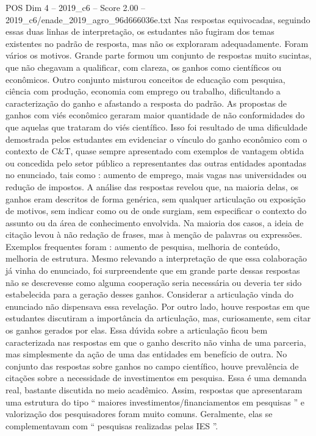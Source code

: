 \begin{textsample}{POS Dim 4 – 2019\_c6 – Score 2.00 – 2019\_c6/enade\_2019\_agro\_96d666036e.txt}
Nas respostas equivocadas, seguindo essas duas linhas de interpretação, os estudantes não fugiram dos temas existentes no padrão de resposta, mas não os exploraram adequadamente.
Foram vários os motivos.
Grande parte formou um conjunto de respostas muito sucintas, que não chegavam a qualificar, com clareza, os ganhos como científicos ou econômicos.
Outro conjunto misturou conceitos de educação com pesquisa, ciência com produção, economia com emprego ou trabalho, dificultando a caracterização do ganho e afastando a resposta do padrão.
As propostas de ganhos com viés econômico geraram maior quantidade de não conformidades do que aquelas que trataram do viés científico.
Isso foi resultado de uma dificuldade demostrada pelos estudantes em evidenciar o vínculo do ganho econômico com o contexto de C\&T, quase sempre apresentado com exemplos de vantagem obtida ou concedida pelo setor público a representantes das outras entidades apontadas no enunciado, tais como : aumento de emprego, mais vagas nas universidades ou redução de impostos.
A análise das respostas revelou que, na maioria delas, os ganhos eram descritos de forma genérica, sem qualquer articulação ou exposição de motivos, sem indicar como ou de onde surgiam, sem especificar o contexto do assunto ou da área de conhecimento envolvida.
Na maioria dos casos, a ideia de citação levou à não redação de frases, mas à menção de palavras ou expressões.
Exemplos frequentes foram : aumento de pesquisa, melhoria de conteúdo, melhoria de estrutura.
Mesmo relevando a interpretação de que essa colaboração já vinha do enunciado, foi surpreendente que em grande parte dessas respostas não se descrevesse como alguma cooperação seria necessária ou deveria ter sido estabelecida para a geração desses ganhos.
Considerar a articulação vinda do enunciado não dispensava essa revelação.
Por outro lado, houve respostas em que estudantes discutiram a importância da articulação, mas, curiosamente, sem citar os ganhos gerados por elas.
Essa dúvida sobre a articulação ficou bem caracterizada nas respostas em que o ganho descrito não vinha de uma parceria, mas simplesmente da ação de uma das entidades em benefício de outra.
No conjunto das respostas sobre ganhos no campo científico, houve prevalência de citações sobre a necessidade de investimentos em pesquisa.
Essa é uma demanda real, bastante discutida no meio acadêmico.
Assim, respostas que apresentaram uma estrutura do tipo “ maiores investimentos/financiamentos em pesquisas ” e valorização dos pesquisadores foram muito comuns.
Geralmente, elas se complementavam com “ pesquisas realizadas pelas IES ”.

\end{textsample}
